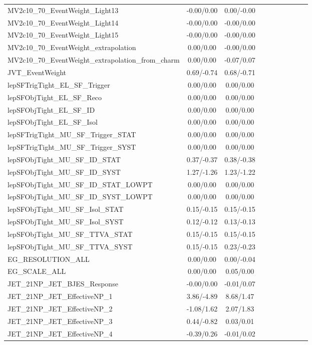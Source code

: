 \begin{table}[h]
\begin{center}
\begin{tabular}{l|ccccccccc}
MV2c10\_70\_EventWeight\_Light13 &-0.00/0.00 &0.00/-0.00 \\
MV2c10\_70\_EventWeight\_Light14 &-0.00/0.00 &-0.00/0.00 \\
MV2c10\_70\_EventWeight\_Light15 &-0.00/0.00 &-0.00/0.00 \\
MV2c10\_70\_EventWeight\_extrapolation &0.00/0.00 &-0.00/0.00 \\
MV2c10\_70\_EventWeight\_extrapolation\_from\_charm &0.00/0.00 &-0.07/0.07 \\
JVT\_EventWeight &0.69/-0.74 &0.68/-0.71 \\
lepSFTrigTight\_EL\_SF\_Trigger &0.00/0.00 &0.00/0.00 \\
lepSFObjTight\_EL\_SF\_Reco &0.00/0.00 &0.00/0.00 \\
lepSFObjTight\_EL\_SF\_ID &0.00/0.00 &0.00/0.00 \\
lepSFObjTight\_EL\_SF\_Isol &0.00/0.00 &0.00/0.00 \\
lepSFTrigTight\_MU\_SF\_Trigger\_STAT &0.00/0.00 &0.00/0.00 \\
lepSFTrigTight\_MU\_SF\_Trigger\_SYST &0.00/0.00 &0.00/0.00 \\
lepSFObjTight\_MU\_SF\_ID\_STAT &0.37/-0.37 &0.38/-0.38 \\
lepSFObjTight\_MU\_SF\_ID\_SYST &1.27/-1.26 &1.23/-1.22 \\
lepSFObjTight\_MU\_SF\_ID\_STAT\_LOWPT &0.00/0.00 &0.00/0.00 \\
lepSFObjTight\_MU\_SF\_ID\_SYST\_LOWPT &0.00/0.00 &0.00/0.00 \\
lepSFObjTight\_MU\_SF\_Isol\_STAT &0.15/-0.15 &0.15/-0.15 \\
lepSFObjTight\_MU\_SF\_Isol\_SYST &0.12/-0.12 &0.13/-0.13 \\
lepSFObjTight\_MU\_SF\_TTVA\_STAT &0.15/-0.15 &0.15/-0.15 \\
lepSFObjTight\_MU\_SF\_TTVA\_SYST &0.15/-0.15 &0.23/-0.23 \\
EG\_RESOLUTION\_ALL &0.00/0.00 &0.00/-0.04 \\
EG\_SCALE\_ALL &0.00/0.00 &0.05/0.00 \\
JET\_21NP\_JET\_BJES\_Response &-0.00/0.00 &-0.01/0.07 \\
JET\_21NP\_JET\_EffectiveNP\_1 &3.86/-4.89 &8.68/1.47 \\
JET\_21NP\_JET\_EffectiveNP\_2 &-1.08/1.62 &2.07/1.83 \\
JET\_21NP\_JET\_EffectiveNP\_3 &0.44/-0.82 &0.03/0.01 \\
JET\_21NP\_JET\_EffectiveNP\_4 &-0.39/0.26 &-0.01/0.02 \\

\end{tabular}
\end{center}
\end{table}
